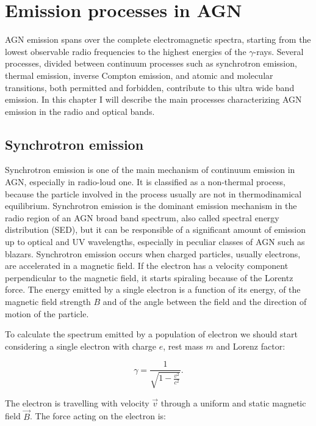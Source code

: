 \documentclass[../main.tex]{subfiles}
\begin{document}
\chapter{Emission processes in AGN}
\label{cap:emission}

AGN emission spans over the complete electromagnetic spectra, starting from the lowest observable radio frequencies to the highest energies of the $\gamma$-rays.
Several processes, divided between continuum processes such as synchrotron emission, thermal emission, inverse Compton emission, and atomic and molecular transitions, both permitted and forbidden, contribute to this ultra wide band emission.
In this chapter I will describe the main processes characterizing AGN emission in the radio and optical bands.

\section{Synchrotron emission}
\label{sec:synchrotron}

Synchrotron emission is one of the main mechanism of continuum emission in AGN, especially in radio-loud one.
It is classified as a non-thermal process, because the particle involved in the process usually are not in thermodinamical equilibrium.
Synchrotron emission is the dominant emission mechanism in the radio region of an AGN broad band spectrum, also called spectral energy distribution (SED), but it can be responsible of a significant amount of emission up to optical and UV wavelengths, especially in peculiar classes of AGN such as blazars.
Synchrotron emission occurs when charged particles, usually electrons, are accelerated in a magnetic field.
If the electron has a velocity component perpendicular to the magnetic field, it starts spiraling because of the Lorentz force.
The energy emitted by a single electron is a function of its energy, of the magnetic field strength $B$ and of the angle between the field and the direction of motion of the particle.

To calculate the spectrum emitted by a population of electron we should start considering a single electron with charge $e$, rest mass $m$ and Lorenz factor:

\begin{equation}
    \label{eq:lorentz}
    \gamma = \frac{1}{\sqrt{1-\frac{v^2}{c^2}}}.
\end{equation}

The electron is travelling with velocity $\vec{v}$ through a uniform and static magnetic field $\vec{B}$.
The force acting on the electron is:
\end{document}
